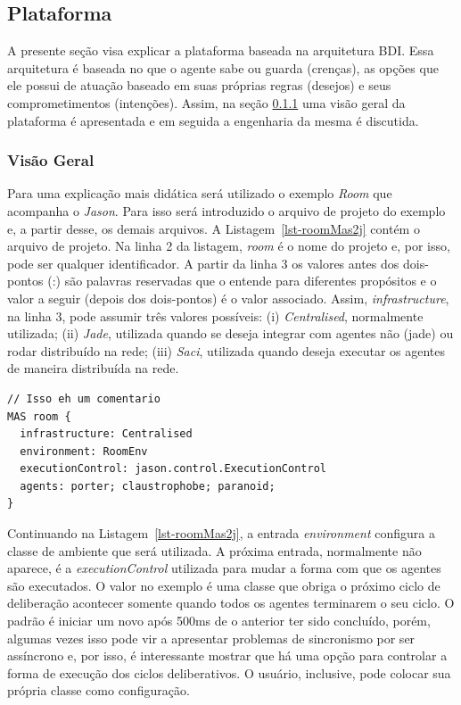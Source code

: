 \subsection{Plataforma \jason} \label{sec:aoppj}

A presente seção visa explicar a plataforma \jason baseada na arquitetura BDI.
Essa arquitetura é baseada no que o agente sabe ou guarda (crenças), as opções
que ele possui de atuação baseado em suas próprias regras (desejos) e seus
comprometimentos (intenções). Assim, na seção \ref{sec-jason-overview} uma
visão geral da plataforma é apresentada e em seguida a engenharia da mesma é
discutida.

\subsubsection{Visão Geral} \label{sec-jason-overview}

Para uma explicação mais didática será utilizado o exemplo \emph{Room} que
acompanha o \emph{Jason}. Para isso será introduzido
o arquivo de projeto do exemplo e, a partir desse, os demais arquivos.
A Listagem~\ref{lst-roomMas2j} contém o arquivo de projeto.
Na linha 2 da listagem, \emph{room} é o nome do projeto e, por isso, pode ser qualquer
identificador. A partir da linha 3 os valores antes dos dois-pontos (:)
são palavras reservadas que o \jason entende para diferentes propósitos e o valor
a seguir (depois dos dois-pontos) é o valor associado.
Assim, \emph{infrastructure}, na linha 3, pode assumir três valores
possíveis: (i) \emph{Centralised}, normalmente utilizada;
(ii) \emph{Jade}, utilizada quando se deseja integrar
com agentes não \jason (jade) ou rodar distribuído na rede; (iii) \emph{Saci}, utilizada
quando deseja executar os agentes de maneira distribuída na rede.

\begin{center}
    \begin{minipage}{120mm}
	\lstset{linewidth=120mm}
	\begin{lstlisting}[frame=trbl, caption=Arquivo de projeto do \jason para o exemplo \emph{Room}, label=lst-roomMas2j]
// Isso eh um comentario
MAS room {
  infrastructure: Centralised
  environment: RoomEnv
  executionControl: jason.control.ExecutionControl
  agents: porter; claustrophobe; paranoid;
}
	\end{lstlisting}
    \end{minipage}
\end{center}

Continuando na Listagem~\ref{lst-roomMas2j}, a entrada \emph{environment}
configura a classe de ambiente que será utilizada. A próxima entrada,
normalmente não aparece, é a \emph{executionControl} utilizada para
mudar a forma com que os agentes são executados. O valor no exemplo é uma
classe que obriga o próximo ciclo de deliberação acontecer somente quando
todos os agentes terminarem o seu ciclo. O padrão é iniciar um novo
após 500ms de o anterior ter sido concluído, porém, algumas vezes isso
pode vir a apresentar problemas de sincronismo por ser assíncrono e, por isso, é interessante
mostrar que há uma opção para controlar a forma de execução dos ciclos
deliberativos. O usuário, inclusive, pode colocar sua própria classe como
configuração.

